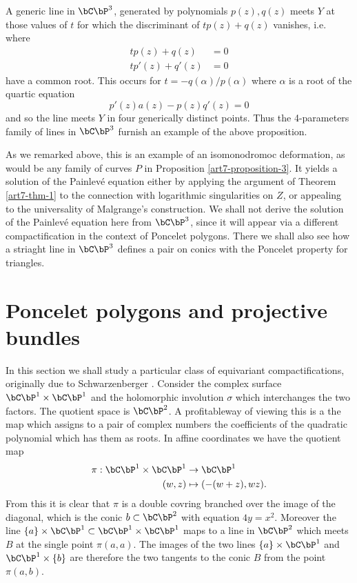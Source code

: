\begin{example*}
\begin{enumerate}[()]
A generic line in $\bC\bP^{3}$, generated by polynomials $p(z), q(z)$ meets $Y$ at those values of $t$ for which the discriminant of $tp(z) + q(z)$ vanishes, i.e. where
\begin{align*}
tp(z) +q(z) &= 0\\
tp'(z)+q'(z) &= 0
\end{align*}
have a common root. This occurs for $t = -q(\alpha)/p(\alpha)$ where $\alpha$ is a root of the quartic equation
$$
p'(z)a(z)-p(z)q'(z) =0
$$
and so the line meets $Y$ in four generically distinct points. Thus the 4-parameters family of lines in $\bC\bP^{3}$ furnish an example of the above proposition.
\end{enumerate}
As we remarked above, this is an example of an isomonodromoc deformation, as would be any family of curves $P$ in Proposition \ref{art7-proposition-3}. It yields a solution of the Painlev\'e equation either by applying the argument of Theorem \ref{art7-thm-1} to the connection with logarithmic singularities on $Z$, or appealing to the universality of Malgrange's construction. We shall not derive the solution of the Painlev\'e equation here from $\bC\bP^{3}$, since it will appear via a different compactification in the context of Poncelet polygons. There we shall also see how a striaght line in $\bC\bP^{3}$ defines a pair on conics with the Poncelet property for triangles.
\end{example*}

\section{Poncelet polygons and projective bundles}\label{art7-sec-4}

In this section we shall study a particular class of equivariant compactifications, originally due to Schwarzenberger \cite{art7-key16}. Consider the complex surface $\bC\bP^{1}\times \bC\bP^{1}$ and the holomorphic involution $\sigma$ which interchanges the two factors. The quotient space is $\bC\bP^{2}$. A profitableway of viewing this is a the map which assigns to a pair of complex numbers the coefficients of the quadratic polynomial which has them as roots. In affine coordinates we have the quotient map
\begin{align*}
\pi : \bC\bP^{1} \times \bC\bP^{1} &\rightarrow \bC\bP^{1}\\
(w, z) &\mapsto (-(w +z), wz).
\end{align*}
From this it is clear that $\pi$ is a double covring branched over the image of the diagonal, which is the
conic $b\subset \bC\bP^{2}$ with equation $4y =x^{2}$. Moreover the line $\{a\} \times \bC\bP^{1} \subset \bC\bP^{1} \times \bC\bP^{1}$ maps to a line in $\bC\bP^{2}$ which meets $B$ at the single point $\pi(a, a)$. The images of the two lines  $\{a\} \times \bC\bP^{1}$ and $\bC\bP^{1} \times \{b\}$ are therefore the two tangents to the conic $B$ from the point $\pi(a, b)$.

